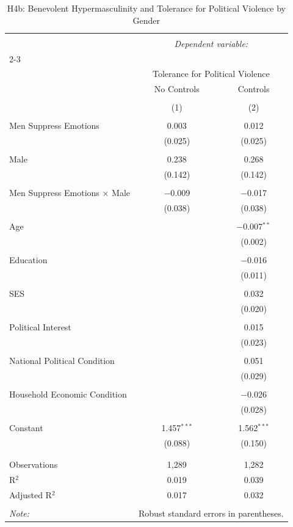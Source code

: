 
\begin{table}[!htbp] \centering 
  \caption{H4b: Benevolent Hypermasculinity and Tolerance for Political Violence by Gender} 
  \label{tab:h4b} 
\begin{tabular}{@{\extracolsep{5pt}}lcc} 
\\[-1.8ex]\hline 
\hline \\[-1.8ex] 
 & \multicolumn{2}{c}{\textit{Dependent variable:}} \\ 
\cline{2-3} 
\\[-1.8ex] & \multicolumn{2}{c}{Tolerance for Political Violence} \\ 
 & No Controls & Controls \\ 
\\[-1.8ex] & (1) & (2)\\ 
\hline \\[-1.8ex] 
 Men Suppress Emotions & 0.003 & 0.012 \\ 
  & (0.025) & (0.025) \\ 
  & & \\ 
 Male & 0.238 & 0.268 \\ 
  & (0.142) & (0.142) \\ 
  & & \\ 
 Men Suppress Emotions × Male & $-$0.009 & $-$0.017 \\ 
  & (0.038) & (0.038) \\ 
  & & \\ 
 Age &  & $-$0.007$^{**}$ \\ 
  &  & (0.002) \\ 
  & & \\ 
 Education &  & $-$0.016 \\ 
  &  & (0.011) \\ 
  & & \\ 
 SES &  & 0.032 \\ 
  &  & (0.020) \\ 
  & & \\ 
 Political Interest &  & 0.015 \\ 
  &  & (0.023) \\ 
  & & \\ 
 National Political Condition &  & 0.051 \\ 
  &  & (0.029) \\ 
  & & \\ 
 Household Economic Condition &  & $-$0.026 \\ 
  &  & (0.028) \\ 
  & & \\ 
 Constant & 1.457$^{***}$ & 1.562$^{***}$ \\ 
  & (0.088) & (0.150) \\ 
  & & \\ 
\hline \\[-1.8ex] 
Observations & 1,289 & 1,282 \\ 
R$^{2}$ & 0.019 & 0.039 \\ 
Adjusted R$^{2}$ & 0.017 & 0.032 \\ 
\hline 
\hline \\[-1.8ex] 
\textit{Note:}  & \multicolumn{2}{r}{Robust standard errors in parentheses.} \\ 
\end{tabular} 
\end{table} 
